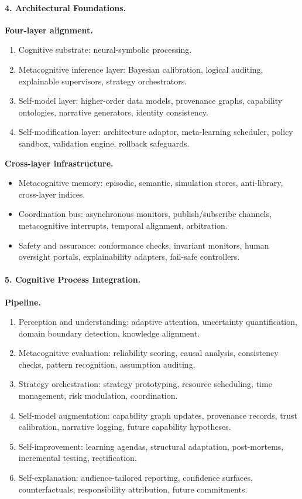 \documentclass[12pt]{article}
\begin{document}
\paragraph{4. Architectural Foundations.}
\textbf{Four-layer alignment.}
\begin{enumerate}
\item Cognitive substrate: neural-symbolic processing.
\item Metacognitive inference layer: Bayesian calibration, logical auditing, explainable supervisors, strategy orchestrators.
\item Self-model layer: higher-order data models, provenance graphs, capability ontologies, narrative generators, identity consistency.
\item Self-modification layer: architecture adaptor, meta-learning scheduler, policy sandbox, validation engine, rollback safeguards.
\end{enumerate}

\textbf{Cross-layer infrastructure.}
\begin{itemize}
\item Metacognitive memory: episodic, semantic, simulation stores, anti-library, cross-layer indices.
\item Coordination bus: asynchronous monitors, publish/subscribe channels, metacognitive interrupts, temporal alignment, arbitration.
\item Safety and assurance: conformance checks, invariant monitors, human oversight portals, explainability adapters, fail-safe controllers.
\end{itemize}

\paragraph{5. Cognitive Process Integration.}
\textbf{Pipeline.}
\begin{enumerate}
\item Perception and understanding: adaptive attention, uncertainty quantification, domain boundary detection, knowledge alignment.
\item Metacognitive evaluation: reliability scoring, causal analysis, consistency checks, pattern recognition, assumption auditing.
\item Strategy orchestration: strategy prototyping, resource scheduling, time management, risk modulation, coordination.
\item Self-model augmentation: capability graph updates, provenance records, trust calibration, narrative logging, future capability hypotheses.
\item Self-improvement: learning agendas, structural adaptation, post-mortems, incremental testing, rectification.
\item Self-explanation: audience-tailored reporting, confidence surfaces, counterfactuals, responsibility attribution, future commitments.
\end{enumerate}
\end{document}
